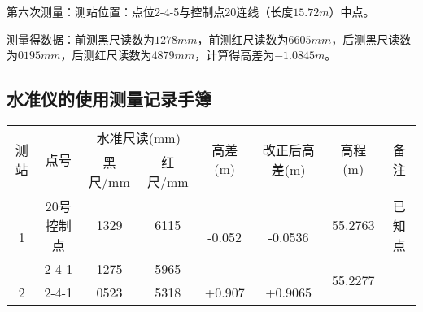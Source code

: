 \documentclass[UTF8]{ctexart}
\begin{document}
	第六次测量：测站位置：点位2-4-5与控制点20连线（长度$ 15.72m $）中点。
	
	测量得数据：前测黑尺读数为$ 1278mm $，前测红尺读数为$ 6605mm $，后测黑尺读数为$ 0195mm $，后测红尺读数为$ 4879mm $，计算得高差为$ -1.0845m $。
	\subsection{水准仪的使用测量记录手簿}
	\begin{table}[h]
		\begin{tabular}{|c|ccccccc|}
			\hline
			\multirow{2}{*}{测站} & \multicolumn{1}{c|}{\multirow{2}{*}{点号}} & \multicolumn{2}{c|}{水准尺读(mm)}                           & \multicolumn{1}{c|}{\multirow{2}{*}{高差(m)}}   & \multicolumn{1}{c|}{\multirow{2}{*}{改正后高差(m)}} & \multicolumn{1}{c|}{\multirow{2}{*}{高程(m)}}   & \multirow{2}{*}{备注} \\ \cline{3-4}
			& \multicolumn{1}{c|}{}                    & \multicolumn{1}{c|}{黑尺/mm} & \multicolumn{1}{c|}{红尺/mm} & \multicolumn{1}{c|}{}                         & \multicolumn{1}{c|}{}                          & \multicolumn{1}{c|}{}                         &                     \\ \hline
			\multirow{2}{*}{1}  & \multicolumn{1}{c|}{20号控制点}              & \multicolumn{1}{c|}{1329}  & \multicolumn{1}{c|}{6115}  & \multicolumn{1}{c|}{\multirow{2}{*}{-0.052}}  & \multicolumn{1}{c|}{\multirow{2}{*}{-0.0536}}  & \multicolumn{1}{c|}{55.2763}                  & 已知点                 \\ \cline{2-4} \cline{7-8} 
			& \multicolumn{1}{c|}{2-4-1}               & \multicolumn{1}{c|}{1275}  & \multicolumn{1}{c|}{5965}  & \multicolumn{1}{c|}{}                         & \multicolumn{1}{c|}{}                          & \multicolumn{1}{c|}{\multirow{2}{*}{55.2277}} & \multirow{10}{*}{}  \\ \cline{1-6}
			\multirow{2}{*}{2}  & \multicolumn{1}{c|}{2-4-1}               & \multicolumn{1}{c|}{0523}  & \multicolumn{1}{c|}{5318}  & \multicolumn{1}{c|}{\multirow{2}{*}{+0.907}}  & \multicolumn{1}{c|}{\multirow{2}{*}{+0.9065}}  & \multicolumn{1}{c|}{}                         &                     \\ \cline{2-4} \cline{7-7}

\end{tabular}
\end{table}
\end{document}
